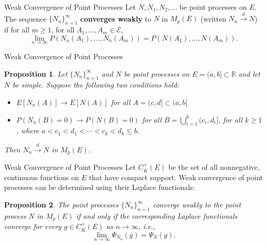 \documentclass{beamer}
\newtheorem{proposition}{Proposition}
\begin{document}
\begin{frame}{Weak Convergence of Point Processes}
    Let $N, N_1, N_2, \ldots$ be point processes on $E$. The sequence $\{N_n\}_{n = 1}^{\infty}$ \textbf{converges weakly} to $N$ in $M_p(E)$ (written $N_n \xrightarrow{d} N$) if for all $m \ge 1$, for all $A_1, \ldots, A_m \in \mathcal{E}$,
    \[
    \lim_{n \to \infty} P(N_n(A_1), \ldots, N_n(A_m)) = P(N(A_1), \ldots, N(A_m)).
    \]
\end{frame}

\begin{frame}{Weak Convergence of Point Processes}
    \begin{proposition}
        Let $\{N_n\}_{n = 1}^{\infty}$ and $N$ be point processes on $E = (a, b] \subset \mathbb{R}$ and let $N$ be simple. Suppose the following two conditions hold:
        \begin{itemize}
            \item $E[N_n(A)] \to E[N(A)]$ for all $A = (c, d] \subset (a, b]$
            \item $P(N_n(B) = 0) \to P(N(B) = 0)$ for all $B = \bigcup_{i = 1}^k (c_i, d_i]$, for all $k \ge 1$, where $a < c_1 < d_1 < \cdots < c_k < d_k \le b$.
        \end{itemize}
        Then $N_n \xrightarrow{d} N$ in $M_p(E)$.
    \end{proposition}
\end{frame}

\begin{frame}{Weak Convergence of Point Processes}
    Let $C_K^+(E)$ be the set of all nonnegative, continuous functions on $E$ that have compact support. Weak convergence of point processes can be determined using their Laplace functionals:
    \begin{proposition}
        The point processes $\{N_n\}_{n = 1}^{\infty}$ converge weakly to the point process $N$ in $M_p(E)$ if and only if the corresponding Laplace functionals converge for every $g \in C_K^+(E)$ as $n \to \infty$, i.e.,
        \[
        \lim_{n \to \infty} \Psi_{N_n}(g) = \Psi_N(g).
        \]
    \end{proposition}
\end{frame}
\end{document}
